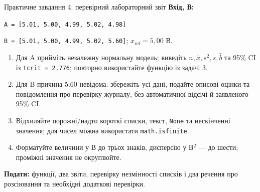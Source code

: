 \documentclass[aspectratio=169,11pt]{beamer}
\newcommand{\xref}{x_{\mathrm{ref}}}
\begin{document}
\begin{frame}{Практичне завдання 4: перевірний лабораторний звіт}
\small
\textbf{Вхід, В:}\par
\texttt{A = [5.01, 5.00, 4.99, 5.02, 4.98]}\par
\texttt{B = [5.01, 5.00, 4.99, 5.02, 5.60]}; $\xref=5{,}00$ В.
\begin{enumerate}
\item Для A прийміть незалежну нормальну модель; виведіть $n,\bar x,s^2,s,\widehat b$ та 95\% CI із \texttt{tcrit = 2.776}; повторно використайте функцію із задачі 3.
\item Для B причина 5.60 невідома: збережіть усі дані, подайте описові оцінки та повідомлення про перевірку журналу, без автоматичної відсічі й заявленого 95\% CI.
\item Відхиляйте порожні/надто короткі списки, текст, \texttt{None} та нескінченні значення; для чисел можна використати \texttt{math.isfinite}.
\item Форматуйте величини у В до трьох знаків, дисперсію у В$^2$ — до шести; проміжні значення не округлюйте.
\end{enumerate}
\textbf{Подати:} функції, два звіти, перевірку незмінності списків і два речення про розсіювання та необхідні додаткові перевірки.
\end{frame}
\end{document}
